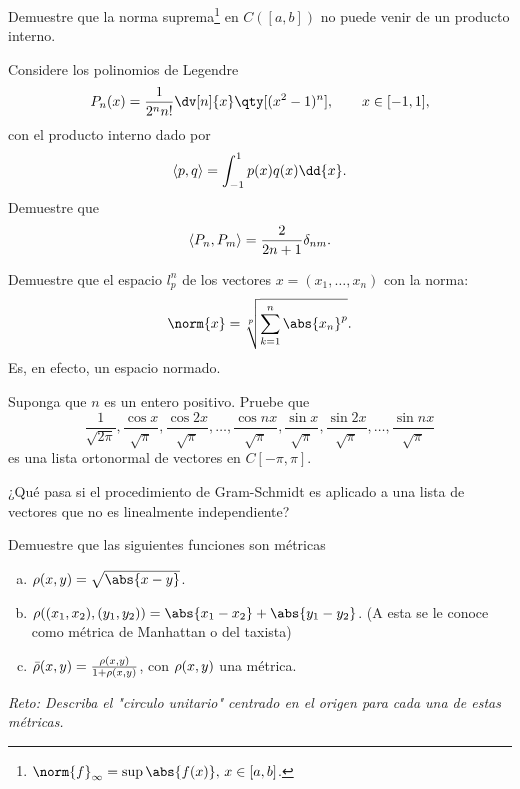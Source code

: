 \begin{ejercicio}
	Demuestre que la norma suprema\footnote{$\norm{f}_\infty = \sup{\abs{f(x)}, \, x \in [a,b]}$.} en $C([a,b])$ no puede venir de un producto interno.
\end{ejercicio}







\begin{ejercicio}
	Considere los polinomios de Legendre
		$$ P_n (x) = \frac{1}{2^n n!} \dv[n]{x} \qty[(x^2 - 1)^n], \qquad x\in [-1,1], $$
	con el producto interno dado por
		$$ \inner{p}{q} = \int _{-1} ^{1} p(x) q(x) \dd{x}. $$
	Demuestre que 
		$$ \langle P_n , P_m \rangle = \frac{2}{2n + 1} \delta _{nm}. $$
\end{ejercicio}





\begin{ejercicio}
	Demuestre que el espacio $l^n _p$ de los vectores $x = (x_1 ,\ldots ,x_n)$ con la norma:
		$$ \norm{x} = \sqrt[p]{\sum _{k = 1} ^n \abs{x_n} ^p}. $$
	Es, en efecto, un espacio normado.
\end{ejercicio}





\begin{ejercicio}
	Suponga que $n$ es un entero positivo. Pruebe que 
		$$ \frac{1}{\sqrt{2\pi}}, \frac{\cos{x}}{\sqrt{\pi}}, \frac{\cos{2x}}{\sqrt{\pi}},\ldots ,\frac{\cos{nx}}{\sqrt{\pi}}, \frac{\sin{x}}{\sqrt{\pi}}, \frac{\sin{2x}}{\sqrt{\pi}},\ldots ,\frac{\sin{nx}}{\sqrt{\pi}}  $$
	es una lista ortonormal de vectores en $C[-\pi,\pi]$.
\end{ejercicio}










\begin{ejercicio}
	¿Qué pasa si el procedimiento de Gram-Schmidt es aplicado a una lista de vectores que no es linealmente independiente?
\end{ejercicio}



\begin{ejercicio}
	Demuestre que las siguientes funciones son métricas
	\begin{enumerate}[a)]
		\item $\metric{x}{y} = \sqrt{\abs{x - y}}$.
		\item $\metric{(x_1 ,x_2)}{(y_1 ,y_2)} = \abs{x_1 - x_2} + \abs{y_1 - y_2}$. (A esta se le conoce como métrica de Manhattan o del taxista)
		\item $\bar{\rho} (x,y) = \frac{\rho(x,y)}{1 + \rho(x,y)}$, con $\rho(x,y)$ una métrica.
	\end{enumerate}
	\textit{Reto: Describa el "circulo unitario" centrado en el origen para cada una de estas métricas.}
\end{ejercicio}











